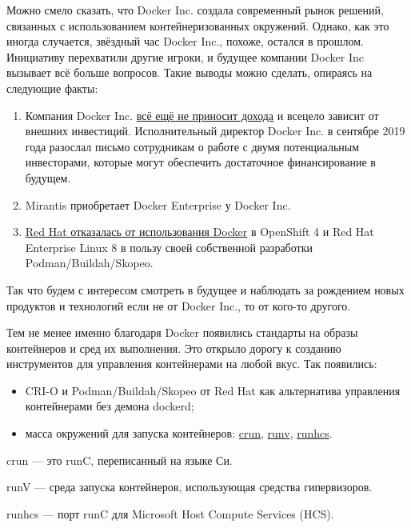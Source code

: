 \documentclass[14pt, a4paper]{article}
\begin{document}
Можно смело сказать, что Docker Inc. создала современный рынок решений, связанных с
использованием контейнеризованных окружений. Однако, как это иногда случается, звёздный час
Docker Inc., похоже, остался в прошлом. Инициативу перехватили другие игроки, и будущее компании
Docker Inc вызывает всё больше вопросов. Такие выводы можно сделать, опираясь на следующие
факты:
\begin{enumerate}
    \item Компания Docker Inc. \href{https://www.cnbc.com/2019/09/27/docker-is-trying-to-raise-money-following-arrival-of-ceo-rob-bearden.html}{всё ещё не приносит дохода} и всецело зависит от внешних инвестиций.
    Исполнительный директор Docker Inc. в сентябре 2019 года разослал письмо сотрудникам о
    работе с двумя потенциальным инвесторами, которые могут обеспечить достаточное
    финансирование в будущем.
    \item Mirantis приобретает Docker Enterprise у Docker Inc.
    \item \href{http://crunchtools.com/docker-support/}{Red Hat отказалась от использования Docker} в OpenShift 4 и Red Hat Enterprise Linux 8 в
    пользу своей собственной разработки Podman/Buildah/Skopeo.
\end{enumerate}

Так что будем с интересом смотреть в будущее и наблюдать за рождением новых продуктов и
технологий если не от Docker Inc., то от кого-то другого.

Тем не менее именно благодаря Docker появились стандарты на образы контейнеров и сред их
выполнения. Это открыло дорогу к созданию инструментов для управления контейнерами на любой
вкус. Так появились:

\begin{itemize}
    \item CRI-O и Podman/Buildah/Skopeo от Red Hat как альтернатива управления контейнерами без
    демона dockerd;
    \item масса окружений для запуска контейнеров: \href{https://github.com/containers/crun}{crun}, \href{https://github.com/hyperhq/runv}{runv}, \href{https://github.com/Microsoft/hcsshim/tree/master/cmd/runhcs}{runhcs}.
\end{itemize}

crun — это runC, переписанный на языке Си.

runV — среда запуска контейнеров, использующая средства гипервизоров.

runhcs — порт runC для Microsoft Host Compute Services (HCS).
\end{document}
